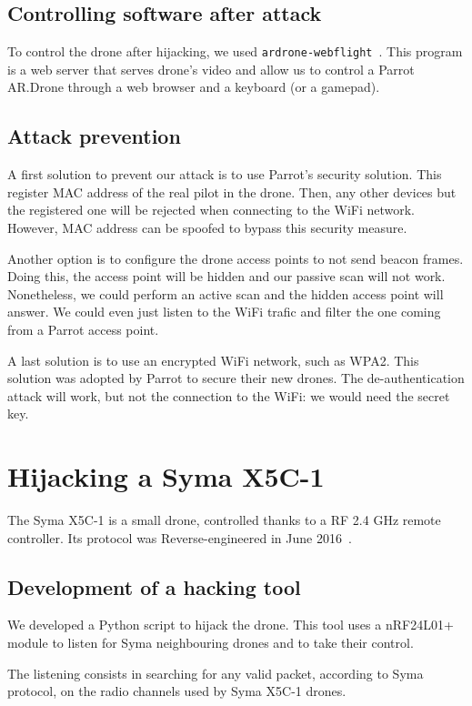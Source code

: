 \documentclass[conference,a4paper]{IEEEtran}
\newcommand{\myv}[1]{\texttt{\small#1}}
\begin{document}
\subsection{Controlling software after attack}
To control the drone after hijacking, we used
\myv{ardrone-webflight}~\cite{bib:webflight}. This program is a web server that serves
drone's video and allow us to control a Parrot AR.Drone through a web browser and a
keyboard (or a gamepad).

\subsection{Attack prevention}
A first solution to prevent our attack is to use Parrot's security solution. This
register MAC address of the real pilot in the drone. Then, any other devices but the
registered one will be rejected when connecting to the WiFi network. However, MAC address
can be spoofed to bypass this security measure.

Another option is to configure the drone access points to not send beacon frames. Doing
this, the access point will be hidden and our passive scan will not work. Nonetheless, we
could perform an active scan and the hidden access point will answer. We could even just
listen to the WiFi trafic and filter the one coming from a Parrot access point.

A last solution is to use an encrypted WiFi network, such as WPA2. This solution
was adopted by Parrot to secure their new drones. The de-authentication attack will work,
but not the connection to the WiFi: we would need the secret key.



\section{Hijacking a Syma X5C-1}
The Syma X5C-1 is a small drone, controlled thanks to a RF 2.4 GHz remote controller. Its
protocol was Reverse-engineered in June 2016~\cite{bib:syma}.

\subsection{Development of a hacking tool}
We developed a Python script to hijack the drone. This tool uses a nRF24L01+ module to
listen for Syma neighbouring drones and to take their control.

The listening consists in searching for any valid packet, according to Syma protocol, on
the radio channels used by Syma X5C-1 drones.
\end{document}
